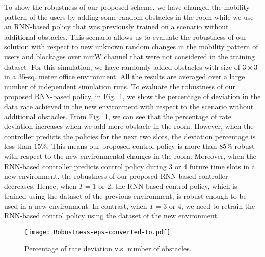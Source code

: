 \documentclass[conference]{IEEEtran}
\begin{document}
To show the robustness of our proposed scheme, we have changed the mobility pattern of the users by adding some random obstacles in the room while we use an RNN-based policy that was previously trained on a scenario without additional obstacles. This scenario allows us to evaluate the robustness of our solution with respect to new unknown random changes in the mobility pattern of users and blockages over mmW channel that were not considered in the training dataset. For this simulation, we have randomly added obstacles with size of $3\times3$ in a 35-sq. meter office environment. All the results are averaged over a large number of independent simulation runs. To evaluate the robustness of our proposed RNN-based policy, in Fig.~\ref{robustness}, we show the percentage of deviation in the data rate achieved in the new environment with respect to the scenario without additional obstacles. From Fig.~\ref{robustness}, we can see that the percentage of rate deviation increases when we add more obstacle in the room. However, when the controller predicts the policies for the next two slots, the  deviation percentage is less than $15\%$. This means our proposed control policy is more than $85\%$ robust with respect to the new environmental changes in the room. Moreover, when the RNN-based controller predicts control policy during 3 or 4 future time slots in a new environment, the robustness of our proposed RNN-based controller decreases. Hence, when $T=1$ or $2$, the RNN-based control policy, which is trained using the dataset of the previous environment, is robust enough to be used in a new environment. In contrast, when $T=3$ or $4$, we need to retrain the RNN-based control policy using the dataset of the new environment.
\begin{figure}[t!]
  \centering
  \texttt{[image: Robustness-eps-converted-to.pdf]}
  \caption{Percentage of rate deviation v.s. number of obstacles.}
   \vspace{-0.5cm}
  \label{robustness}
\end{figure}
\end{document}
